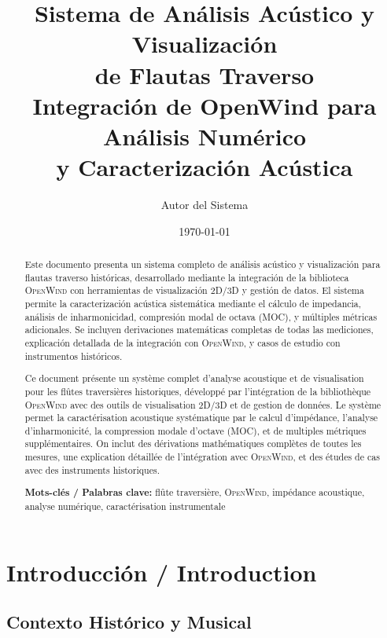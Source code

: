 \documentclass[12pt,a4paper,twocolumn]{article}
\title{\textbf{Sistema de Análisis Acústico y Visualización\\de Flautas Traverso}\\
\large{Integración de OpenWind para Análisis Numérico\\y Caracterización Acústica}}
\author{Autor del Sistema}
\date{\today}
\newcommand{\openwind}{\textsc{OpenWind}}
\begin{document}
\maketitle

\begin{abstract}
Este documento presenta un sistema completo de análisis acústico y visualización para flautas traverso históricas, desarrollado mediante la integración de la biblioteca \openwind{} con herramientas de visualización 2D/3D y gestión de datos. El sistema permite la caracterización acústica sistemática mediante el cálculo de impedancia, análisis de inharmonicidad, compresión modal de octava (MOC), y múltiples métricas adicionales. Se incluyen derivaciones matemáticas completas de todas las mediciones, explicación detallada de la integración con \openwind{}, y casos de estudio con instrumentos históricos.

\vspace{0.5cm}
Ce document présente un système complet d'analyse acoustique et de visualisation pour les flûtes traversières historiques, développé par l'intégration de la bibliothèque \openwind{} avec des outils de visualisation 2D/3D et de gestion de données. Le système permet la caractérisation acoustique systématique par le calcul d'impédance, l'analyse d'inharmonicité, la compression modale d'octave (MOC), et de multiples métriques supplémentaires. On inclut des dérivations mathématiques complètes de toutes les mesures, une explication détaillée de l'intégration avec \openwind{}, et des études de cas avec des instruments historiques.

\vspace{0.3cm}
\textbf{Mots-clés / Palabras clave:} flûte traversière, \openwind{}, impédance acoustique, analyse numérique, caractérisation instrumentale
\end{abstract}

\tableofcontents
\newpage

\section{Introducción / Introduction}

\subsection{Contexto Histórico y Musical}
\end{document}

